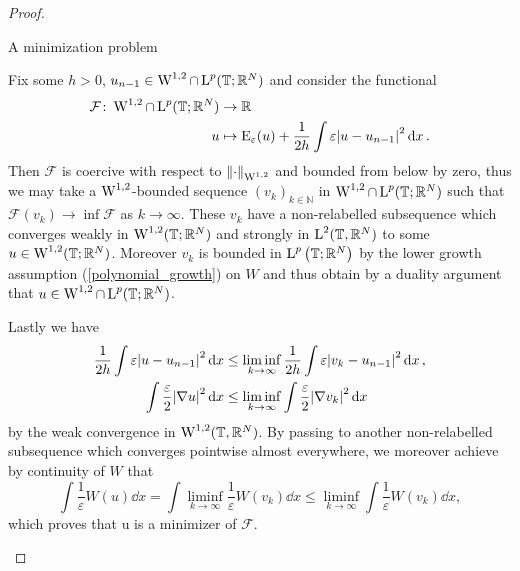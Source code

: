 \begin{proof}
	\begin{description}[wide=0pt]
		\item[Step 1:] A minimization problem
		
		Fix some $ h > 0 $, $ u_{ n - 1 } \in \operatorname{W}^{1 , 2 }\cap \operatorname{L}^{ p } ( \operatorname{\mathbb{T}}; \mathbb{ R }^{ N } ) $ and consider the functional
		\begin{align}
			\label{de_giorgi_min_functional}
			\mathcal{ F } \colon \operatorname{W}^{ 1, 2 } \cap \operatorname{L}^{ p } ( \operatorname{\mathbb{T}} ; \mathbb{ R }^{ N } )
			& \to
			\mathbb{ R }
			\\
			u & \mapsto 
			\operatorname{E}_{ \varepsilon } ( u ) + 
			\frac{ 1 }{ 2h } \int \varepsilon \abs{ u - u_{ n - 1 } }^{ 2 } \dd{x }
			\notag .
		\end{align}
		Then $ \mathcal{ F } $ is coercive with respect to 
		$ \norm{ \cdot }_{ \operatorname{W}^{ 1, 2 } } $ 
		and bounded from below by zero, thus we may take a $ \operatorname{W}^{ 1 , 2 } $-bounded sequence  
		$ (v_{ k } )_{ k \in \mathbb{ N } } $ in $ \operatorname{W}^{ 1 , 2} \cap \operatorname{L}^{ p } ( \operatorname{\mathbb{T}} ; \mathbb{ R }^{ N } ) $ such that 
		$ \mathcal{ F } ( v_{ k } ) \to \inf \mathcal{ F } $ as $ k \to \infty $. 
		These $ v_{ k } $ have a non-relabelled subsequence which converges weakly in $ \operatorname{W}^{ 1 , 2 } ( \operatorname{\mathbb{T}} ; \mathbb{ R }^{ N } ) $ and strongly in $ \operatorname{L}^{ 2 } ( \operatorname{\mathbb{T}}, \mathbb{ R }^{ N } ) $ to some $ u \in \operatorname{W}^{ 1, 2 } ( \operatorname{\mathbb{T}}; \mathbb{ R }^{ N } ) $.
		Moreover $ v_{ k } $ is bounded in $ \operatorname{L}^{ p } \left( \operatorname{\mathbb{T}} ; \mathbb{ R }^{ N } \right)$ by the lower growth assumption (\ref{polynomial_growth}) on $ W $
		and thus obtain by a duality argument that $ u \in \operatorname{W}^{ 1 , 2 } \cap \operatorname{L}^{ p } ( \operatorname{\mathbb{T}} ; \mathbb{ R }^{ N } ) $.
		
		Lastly we have 
		\begin{align}
			\frac{ 1 }{ 2 h }
			\int \varepsilon \abs{ u - u_{ n - 1 } }^{ 2 } \dd{ x}
			& \leq
			\liminf_{ k \to \infty }
			\frac{ 1 }{ 2h }
			\int \varepsilon \abs{ v_{ k } - u_{ n -1 } }^{ 2 } \dd{ x },
			\\
			\int \frac{ \varepsilon }{ 2 } \abs{ \nabla u }^{ 2 } \dd{ x }
			& \leq
			\liminf_{ k \to \infty }
			\int \frac{ \varepsilon }{ 2 } \abs{ \nabla v_{ k } }^{ 2 } \dd{ x }
		\end{align}
		by the weak convergence in $ \operatorname{W}^{ 1 , 2 } ( \operatorname{\mathbb{T}} , \mathbb{ R }^{ N } )$.
		By passing to another non-relabelled subsequence which converges pointwise almost everywhere, we moreover achieve by continuity of $ W $ that
		\begin{equation*}
			\int \frac{ 1 }{ \varepsilon } W ( u ) \dd{ x }
			=
			\int \liminf_{ k \to \infty } \frac{ 1 }{ \varepsilon } W ( v_{k } ) \dd{ x }
			\leq
			\liminf_{ k \to \infty } \int \frac{ 1 }{ \varepsilon } W ( v_{ k } ) \dd{x},
		\end{equation*}
		which proves that u is a minimizer of $ \mathcal{ F } $.
		

\end{description}
\end{proof}
